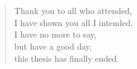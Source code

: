 



\thispagestyle{plain}

\section*{}



\vspace*{7cm}

\begin{verse}
    \hspace{8em}Thank you to all who attended, \\
    \vspace{5pt}
    \hspace{8em}I have shown you all I intended. \\
    \vspace{5pt}
    \hspace{8em}I have no more to say,  \\
    \vspace{5pt}
    \hspace{8em}but have a good day,    \\
    \vspace{5pt}
    \hspace{8em}this thesis has finally ended.

\end{verse}













